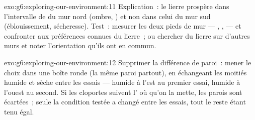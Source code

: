 \begin{solution}{exo:g6:exploring-our-environment:11}
Explication~: le lierre prospère dans l'intervalle de  du
mur nord (ombre, ) et non dans celui du mur sud
(éblouissement, sécheresse). Test~: mesurer les deux pieds de mur
--- , ,  --- et confronter aux préférences
connues du lierre~; ou chercher du lierre sur d'autres murs et noter
l'orientation qu'ils ont en commun.
\end{solution}

\begin{solution}{exo:g6:exploring-our-environment:12}
Supprimer la différence de paroi~: mener le choix dans une boîte
ronde (la même paroi partout), en échangeant les moitiés humide et
sèche entre les essais --- humide à l'est au premier essai, humide à
l'ouest au second. Si les cloportes suivent l' où qu'on la
mette, les parois sont écartées~; seule la condition testée a changé
entre les essais, tout le reste étant tenu égal.
\end{solution}

